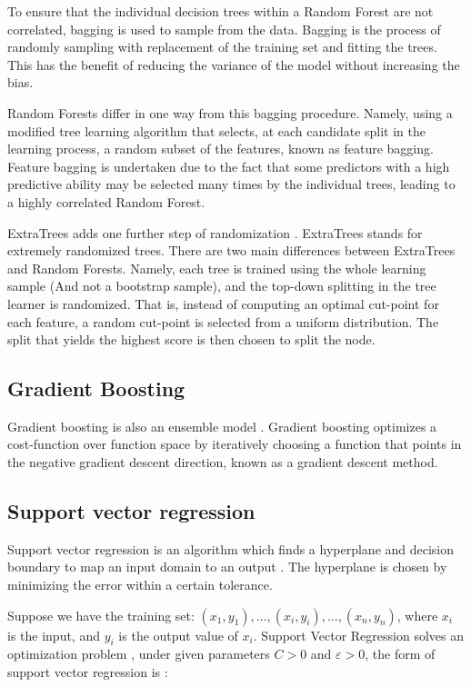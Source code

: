 \documentclass[final,3p,times,twocolumn,numbers]{elsarticle}
\begin{document}
To ensure that the individual decision trees within a Random Forest are not correlated, bagging is used to sample from the data. Bagging is the process of randomly sampling with replacement of the training set and fitting the trees. This has the benefit of reducing the variance of the model without increasing the bias. 

Random Forests differ in one way from this bagging procedure. Namely, using a modified tree learning algorithm that selects, at each candidate split in the learning process, a random subset of the features, known as feature bagging. Feature bagging is undertaken due to the fact that some predictors with a high predictive ability may be selected many times by the individual trees, leading to a highly correlated Random Forest.

ExtraTrees adds one further step of randomization \cite{Fike1988}. ExtraTrees stands for extremely randomized trees. There are two main differences between ExtraTrees and Random Forests. Namely, each tree is trained using the whole learning sample (And not a bootstrap sample), and the top-down splitting in the tree learner is randomized. That is, instead of computing an optimal cut-point for each feature, a random cut-point is selected from a uniform distribution. The split that yields the highest score is then chosen to split the node. 


\subsection{Gradient Boosting}

Gradient boosting is also an ensemble model \cite{316}. Gradient boosting optimizes a cost-function over function space by iteratively choosing a function that points in the negative gradient descent direction, known as a gradient descent method.

\subsection{Support vector regression}

Support vector regression is an algorithm which finds a hyperplane and decision boundary to map an input domain to an output \cite{Cortes1995}. The hyperplane is chosen by minimizing the error within a certain tolerance.

Suppose we have the training set: $(x_1,y_1), \ldots,(x_i,y_i),\ldots,(x_n,y_n)$, where $x_i$ is the input, and $y_i$ is the output value of $x_i$. Support Vector Regression solves an optimization problem \cite{Shu2006,Chen2004}, under given parameters $C>0$ and $\varepsilon >0$, the form of support vector regression is \cite{Drucker1997}: 
\end{document}
